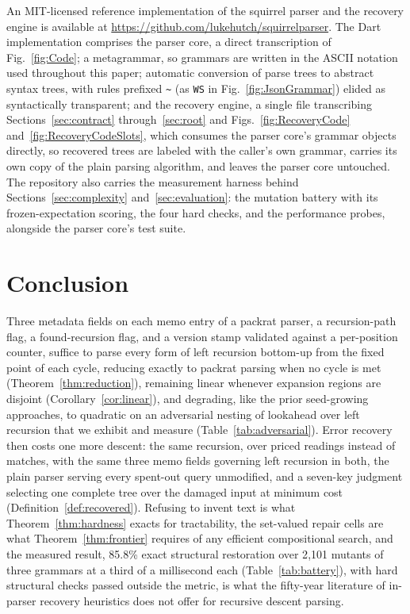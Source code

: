 \documentclass[manuscript]{acmart}
\newcommand{\cd}[1]{\texttt{#1}}
\begin{document}
An MIT-licensed reference implementation of the squirrel parser and the recovery engine is available at \url{https://github.com/lukehutch/squirrelparser}. The Dart implementation comprises the parser core, a direct transcription of Fig.~\ref{fig:Code}; a metagrammar, so grammars are written in the ASCII notation used throughout this paper; automatic conversion of parse trees to abstract syntax trees, with rules prefixed \cd{\~{}} (as \cd{WS} in Fig.~\ref{fig:JsonGrammar}) elided as syntactically transparent; and the recovery engine, a single file transcribing Sections~\ref{sec:contract} through~\ref{sec:root} and Figs.~\ref{fig:RecoveryCode} and~\ref{fig:RecoveryCodeSlots}, which consumes the parser core's grammar objects directly, so recovered trees are labeled with the caller's own grammar, carries its own copy of the plain parsing algorithm, and leaves the parser core untouched. The repository also carries the measurement harness behind Sections~\ref{sec:complexity} and~\ref{sec:evaluation}: the mutation battery with its frozen-expectation scoring, the four hard checks, and the performance probes, alongside the parser core's test suite.

\section{Conclusion}
\label{sec:conclusion}

Three metadata fields on each memo entry of a packrat parser, a recursion-path flag, a found-recursion flag, and a version stamp validated against a per-position counter, suffice to parse every form of left recursion bottom-up from the fixed point of each cycle, reducing exactly to packrat parsing when no cycle is met (Theorem~\ref{thm:reduction}), remaining linear whenever expansion regions are disjoint (Corollary~\ref{cor:linear}), and degrading, like the prior seed-growing approaches, to quadratic on an adversarial nesting of lookahead over left recursion that we exhibit and measure (Table~\ref{tab:adversarial}). Error recovery then costs one more descent: the same recursion, over priced readings instead of matches, with the same three memo fields governing left recursion in both, the plain parser serving every spent-out query unmodified, and a seven-key judgment selecting one complete tree over the damaged input at minimum cost (Definition~\ref{def:recovered}). Refusing to invent text is what Theorem~\ref{thm:hardness} exacts for tractability, the set-valued repair cells are what Theorem~\ref{thm:frontier} requires of any efficient compositional search, and the measured result, 85.8\% exact structural restoration over 2{,}101 mutants of three grammars at a third of a millisecond each (Table~\ref{tab:battery}), with hard structural checks passed outside the metric, is what the fifty-year literature of in-parser recovery heuristics does not offer for recursive descent parsing.
\end{document}
